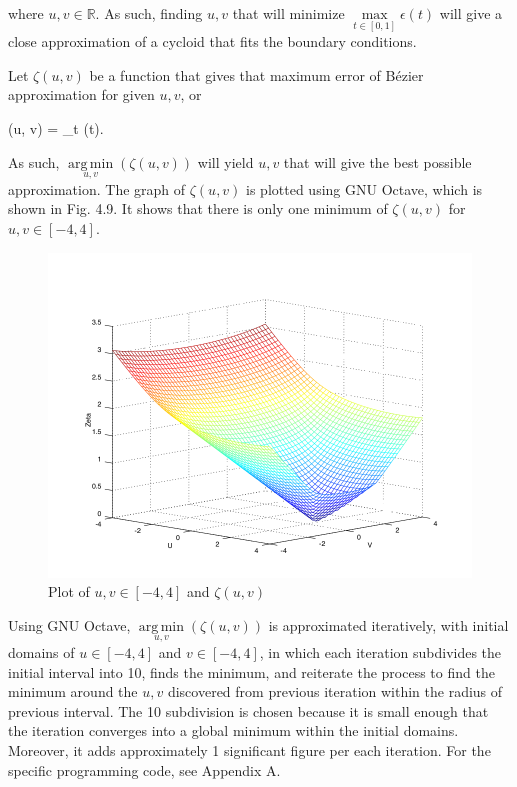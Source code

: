 \documentclass[12pt, oneside, appendixprefix=Appendix]{article}
\DeclareMathOperator*{\argmin}{arg\,min}
\theoremstyle{definition}
\newenvironment{equation_numbered}
{\begin{spacing}{1.0} \begin{equation}}
{\end{equation}\end{spacing}}
\numberwithin{figure}{section}
\begin{document}
\noindent where $u, v \in \mathbb{R}$. As such, finding $u, v$ that will minimize $\max\limits_{t \in [0, 1]} \epsilon (t)$ will give a close approximation of a cycloid that fits the boundary conditions.

Let $\zeta (u, v)$ be a function that gives that maximum error of B\'ezier approximation for given $u, v$, or

\begin{equation_numbered}
\zeta (u, v) = \max\limits_{t \in [0, 1]} \epsilon (t).
\end{equation_numbered}

\noindent As such, $\argmin\limits_{u, v} (\zeta (u, v))$ will yield $u, v$ that will give the best possible approximation. The graph of $\zeta (u, v)$ is plotted using GNU Octave, which is shown in Fig. 4.9. It shows that there is only one minimum of $\zeta (u, v)$ for $u, v \in [-4, 4]$.

\begin{figure}[H]
	\centering
	\includegraphics[width=13cm]{numerical_analysis_graph}
	\caption{Plot of $u, v \in [-4, 4]$ and $\zeta (u, v)$}
\end{figure}

Using GNU Octave, $\argmin\limits_{u, v} (\zeta (u, v))$ is approximated iteratively, with initial domains of $u \in [-4, 4]$ and $v \in [-4, 4]$, in which each iteration subdivides the initial interval into 10, finds the minimum, and reiterate the process to find the minimum around the $u, v$ discovered from previous iteration within the radius of previous interval. The 10 subdivision is chosen because it is small enough that the iteration converges into a global minimum within the initial domains. Moreover, it adds approximately 1 significant figure per each iteration. For the specific programming code, see Appendix A.
\end{document}
